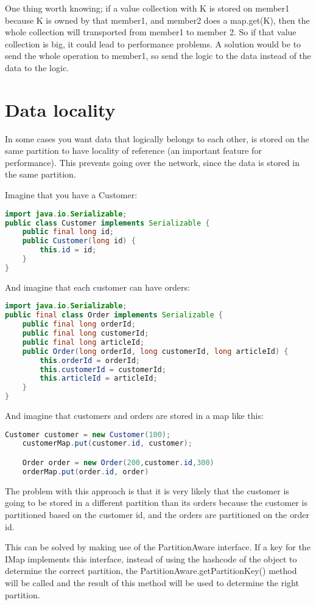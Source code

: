 One thing worth knowing; if a value collection with K is stored on member1 because K is owned by that member1, and member2 does a map.get(K), then the whole collection will transported from member1 to member 2. So if that value collection is big, it could lead to performance problems. A solution would be to send the whole operation to member1, so send the logic to the data instead of the data to the logic.

\section{Data locality}
In some cases you want data that logically belongs to each other, is stored on the same partition to have locality of reference (an important feature for performance). This prevents going over the network, since the data is stored in the same partition.

Imagine that you have a Customer:
\begin{lstlisting}[language=java]
import java.io.Serializable;
public class Customer implements Serializable {
    public final long id;
    public Customer(long id) {
        this.id = id;
    }
}
\end{lstlisting}
And imagine that each customer can have orders:
\begin{lstlisting}[language=java]
import java.io.Serializable;
public final class Order implements Serializable {
    public final long orderId;
    public final long customerId;
    public final long articleId;
    public Order(long orderId, long customerId, long articleId) {
        this.orderId = orderId;
        this.customerId = customerId;
        this.articleId = articleId;
    }
}
\end{lstlisting}
And imagine that customers and orders are stored in a map like this:
\begin{lstlisting}[language=java]
    Customer customer = new Customer(100);
    customerMap.put(customer.id, customer);

    Order order = new Order(200,customer.id,300)
	orderMap.put(order.id, order)
\end{lstlisting}
The problem with this approach is that it is very likely that the customer is going to be stored in a different partition than its orders because the customer is partitioned based on the customer id, and the orders are partitioned on the order id.

This can be solved by making use of the PartitionAware interface. If a key for the IMap implements this interface, instead of using the hashcode of the object to determine the correct partition, the PartitionAware.getPartitionKey() method will be called and the result of this method will be used to determine the right partition. 

